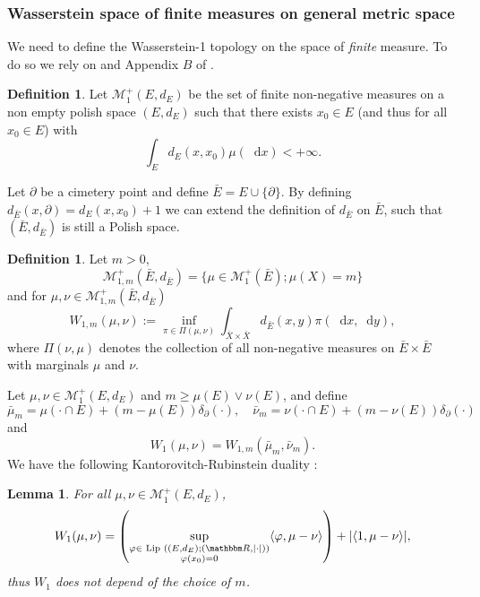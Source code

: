 \documentclass[a4paper,11pt, reqno]{amsart}
\newcommand{\cM}{\mathcal{M}}	\newcommand{\MM}{\mathbbm{M}}
\newcommand{\dd}{\mathop{}\!\mathrm{d}}
\newcommand{\1}{\mathbbm{1}}
\newcommand{\assign}{:=}
\theoremstyle{plain}
\newtheorem{lemma}[theorem]{Lemma}
\theoremstyle{definition}
\newtheorem{definition}[theorem]{Definition}
\begin{document}
\subsubsection{Wasserstein space of finite measures on general metric space}

We need to define the Wasserstein-1 topology on the space of \emph{finite}
measure. To do so we rely on {\cite{martiniKolmogorovEquationsSpaces2023}} and
Appendix $B$ of {\cite{claisseMeanFieldGames2023b}}.

\begin{definition}
  Let $\cM_1^+ (E, d_E)$ be the set of finite non-negative measures on
  a non empty polish space $(E, d_E)$ such that there exists $x_0 \in E$ (and
  thus for all $x_0 \in E$) with
  \[ \int_E d_E (x, x_0) \mu (\dd x) < + \infty . \]
\end{definition}

Let $\partial$ be a cimetery point and define $\bar{E} = E \cup \{ \partial
\}$. By defining $d_{\bar{E}} (x, \partial) = d_E (x, x_0) + 1$ we can extend
the definition of $d_{\bar{E}}$ on $\bar{E}$, such that $(\bar{E},
d_{\bar{E}})$ is still a Polish space.

\begin{definition}
  Let $m > 0$,
  \[ \cM_{1, m}^+ (\bar{E}, d_{\bar{E}}) = \{ \mu \in \cM_1^+
     (\bar{E}) ; \mu (X) = m \} \]
  and for $\mu, \nu \in \cM_{1, m}^+ (\bar{E}, d_{\bar{E}})$
  \[ W_{1, m} (\mu, \nu) \assign \inf_{\pi \in \Pi (\mu, \nu)} \int_{\bar{X}
     \times \bar{X}} d_{\bar{E}} (x, y) \pi (\dd x, \dd y), \]
  where $\Pi (\nu, \mu)$ denotes the collection of all non-negative measures
  on $\bar{E} \times \bar{E}$ with marginals $\mu$ and $\nu$.
\end{definition}

Let $\mu, \nu \in \cM_1^+ (E, d_E)$ and $m \ge \mu (E) \vee \nu
(E)$, and define
\begin{equation}
  \bar{\mu}_m = \mu (\cdot \cap E) + (m - \mu (E)) \delta_{\partial}
  (\cdot), \quad \bar{\nu}_m = \nu (\cdot \cap E) + (m - \nu (E))
  \delta_{\partial} (\cdot) \label{eq:defmum}
\end{equation}
and
\[ W_1 (\mu, \nu) = W_{1, m} (\bar{\mu}_m, \bar{\nu}_m) . \]
We have the following Kantorovitch-Rubinstein duality :

\begin{lemma}
  \label{lemma:monge-kanto}
  For all $\mu, \nu \in \cM_1^+ (E, d_E)$,
  \[ W_1 (\mu , \nu) = \left( \underset{\substack{
       \varphi \in  \text{ Lip } ((E, d_E) ; (\RR, | \cdot |))\\
       \varphi (x_0) = 0
}}{\sup} \langle \varphi, \mu - \nu \rangle \right) + | \langle
     1, \mu - \nu \rangle |, \]
  thus $W_1$ does not depend of the choice of $m$.
\end{lemma}
\end{document}
